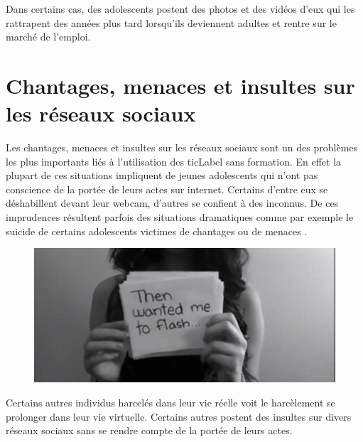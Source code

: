 Dans certains cas, des adolescents postent des photos et des vidéos
d'eux qui les rattrapent des années plus tard lorsqu'ils deviennent
adultes et rentre sur le marché de l'emploi.


\section{Chantages, menaces et insultes sur les réseaux sociaux}
Les chantages, menaces et insultes sur les réseaux sociaux sont un des problèmes les plus importants liés à l'utilisation des \gls{ticLabel} sans formation. En effet la plupart de ces situations impliquent de jeunes adolescents qui n'ont pas conscience de la portée de leurs actes sur internet. Certains d'entre eux se déshabillent devant leur webcam, d'autres se confient à des inconnus. De ces imprudences résultent parfois des situations dramatiques comme par exemple le suicide de certains adolescents victimes de chantages ou de menaces \cite{chantage_facebook, harcel_facebook}.

\begin{figure}[h]
\centering
\includegraphics[scale=1]{../resources/illustrations/Amanda_Todd}
\end{figure}

Certains autres individus harcelés dans leur vie réelle voit le harcèlement se prolonger dans leur vie virtuelle. Certains autres postent des insultes sur divers réseaux sociaux sans se rendre compte de la portée de leurs actes.





